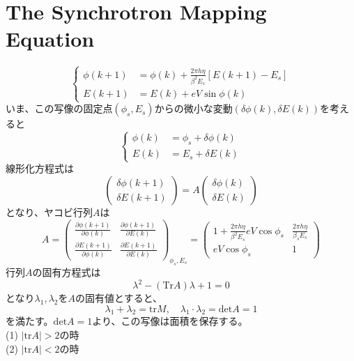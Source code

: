 \documentclass[]{jlreq}
\begin{document}
\section{The Synchrotron Mapping Equation}

\begin{equation}
  \left\{
    \begin{aligned}
      \phi(k+1) &= \phi(k) + \frac{2\pi h \eta }{\beta^2 E_s}[E(k+1)-E_s] \\
      E(k+1) &= E(k)+ e V \sin\phi(k)
    \end{aligned}
  \right.
\end{equation}
%
いま、この写像の固定点$(\phi_s , E_s)$からの微小な変動$(\delta \phi(k) , \delta E(k))$を考えると
%
\begin{equation}
    \left\{
      \begin{aligned}
        \phi(k) &= \phi_s + \delta \phi(k) \\
        E(k) &= E_s + \delta E(k)
      \end{aligned}
    \right.
\end{equation}
%
線形化方程式は
%
\begin{equation}
  \begin{pmatrix}
    \delta\phi (k+1)\\
    \delta E (k+1)
  \end{pmatrix}
  = A
  \begin{pmatrix}
    \delta\phi(k)\\
    \delta E(k)
  \end{pmatrix}
\end{equation}
%
となり、ヤコビ行列$A$は
%
\begin{equation}
  A =
  \begin{pmatrix}
    \frac{\partial\phi(k+1)}{\partial\phi(k)} & \frac{\partial\phi(k+1)}{\partial E(k)} \\
    \frac{\partial E(k+1)}{\partial\phi(k)} & \frac{\partial E(k+1)}{\partial E(k)}
  \end{pmatrix}
  _{\phi_s, E_s} =
  \begin{pmatrix}
    1+\frac{2\pi h \eta}{\beta^2 E_s} e V \cos\phi_s & \frac{2\pi h\eta}{\beta_s E_s} \\
    e V \cos\phi_s & 1
  \end{pmatrix}
\end{equation}
%
行列$A$の固有方程式は
%
\begin{equation}
    \lambda^2 -(\mathrm{Tr} A) \lambda +1 =0
\end{equation}
%
となり$\lambda_1, \lambda_2$を$A$の固有値とすると、
%
\begin{equation}
    \lambda_1+\lambda_2=\mathrm{tr} M ,\quad \lambda_1 \cdot \lambda_2 =\mathrm{det} A = 1
\end{equation}
%
を満たす。$\mathrm{det}A=1$より、この写像は面積を保存する。\\
%
(1) $|\mathrm{tr}A| > 2$の時\\
(2) $|\mathrm{tr}A| < 2$の時\\
\end{document}
